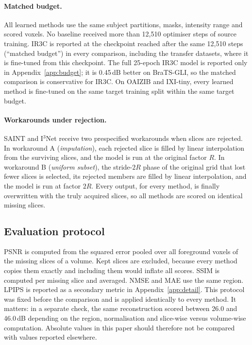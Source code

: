 \documentclass[a4paper,fleqn]{cas-dc}
\newcommand{\Ithree}{I$^3$Net\xspace}
\begin{document}
\paragraph{Matched budget.} All learned methods use the same subject partitions, masks,
intensity range and scored voxels. No baseline received more than 12,510 optimiser steps of
source training. IR3C is reported at the checkpoint reached after the same 12,510 steps
(``matched budget'') in every comparison, including the transfer datasets, where it is
fine-tuned from this checkpoint. The full 25-epoch IR3C model is reported only in
Appendix~\ref{app:budget}; it is 0.45\,dB better on BraTS-GLI, so the matched comparison is
conservative for IR3C. On OAIZIB and IXI-tiny, every learned method is fine-tuned on the same
target training split within the same target budget.

\paragraph{Workarounds under rejection.} SAINT and \Ithree receive two prespecified
workarounds when slices are rejected. In workaround A (\emph{imputation}), each rejected
slice is filled by linear interpolation from the surviving slices, and the model is run at
the original factor $R$. In workaround B (\emph{uniform subset}), the stride-$2R$ phase of the
original grid that lost fewer slices is selected, its rejected members are filled by linear
interpolation, and the model is run at factor $2R$. Every output, for every method, is
finally overwritten with the truly acquired slices, so all methods are scored on identical
missing slices.

\subsection{Evaluation protocol}
\label{sec:protocol}

PSNR is computed from the squared error pooled over all foreground voxels of the missing
slices of a volume. Kept slices are excluded, because every method copies them exactly and
including them would inflate all scores. SSIM \citep{wang2004ssim} is computed per missing
slice and averaged. NMSE and MAE use the same region. LPIPS \citep{zhang2018lpips} is
reported as a secondary metric in Appendix~\ref{app:detail}. This protocol was fixed before
the comparison and is applied identically to every method. It matters: in a separate check,
the same reconstruction scored between 26.0 and 46.0\,dB depending on the region,
normalisation and slice-wise versus volume-wise computation. Absolute values in this paper
should therefore not be compared with values reported elsewhere.
\end{document}
